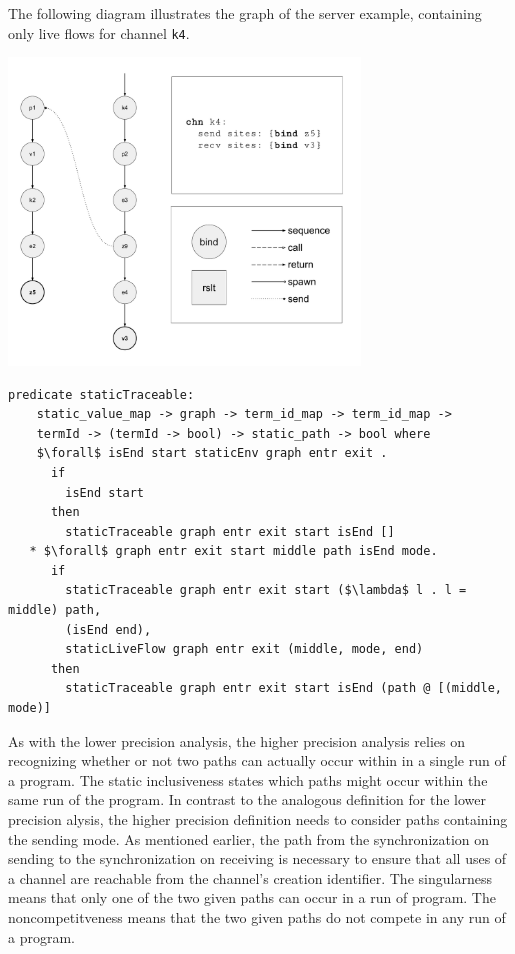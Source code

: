 \documentclass[letterpaper, 11pt]{extarticle}
\begin{document}
The following diagram illustrates the graph of the server example,
containing only live flows for channel \lstinline{k4}. \

\includegraphics[width=0.7\textwidth]{cml-graph-k4.pdf}

\begin{lstlisting}[language=logic, mathescape]
  predicate staticTraceable:
    static_value_map -> graph -> term_id_map -> term_id_map ->
    termId -> (termId -> bool) -> static_path -> bool where
    $\forall$ isEnd start staticEnv graph entr exit .
      if
        isEnd start
      then
        staticTraceable graph entr exit start isEnd []
   * $\forall$ graph entr exit start middle path isEnd mode. 
      if
        staticTraceable graph entr exit start ($\lambda$ l . l = middle) path, 
        (isEnd end),
        staticLiveFlow graph entr exit (middle, mode, end) 
      then
        staticTraceable graph entr exit start isEnd (path @ [(middle, mode)]
\end{lstlisting}

As with the lower precision analysis, the higher precision analysis relies on recognizing
whether or not two paths can actually occur within in a single run of a program. The static
inclusiveness states which paths might occur within the same run of the program.
In contrast to the analogous definition for the lower precision
alysis, the higher precision definition needs to consider paths containing the
sending mode.  As mentioned earlier, the path from the synchronization on sending to the
synchronization on receiving is necessary to ensure that all uses of a channel are reachable
from the channel's creation identifier.  The singularness means that only one of the two
given paths can occur in a run of program.  The noncompetitveness means that the two
given paths do not compete in any run of a program. 
\end{document}
